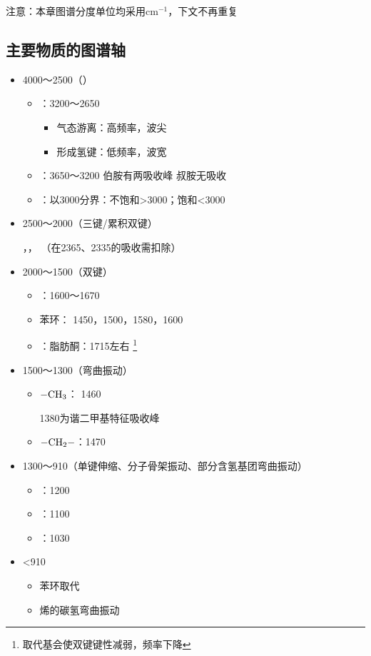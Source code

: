 注意：本章图谱分度单位均采用$\mathrm{cm^{-1}}$，下文不再重复

\subsection{主要物质的图谱轴}
\begin{itemize}
    \item 4000～2500（）
    \begin{itemize}         
        \item {}：3200～2650
        \begin{itemize}
            \item 气态游离：高频率，波尖
            \item 形成氢键：低频率，波宽
        \end{itemize}       
        \item {}：3650～3200	伯胺有两吸收峰 叔胺无吸收
        \item {}：以3000分界：不饱和>3000；饱和<3000
    \end{itemize}
    \item 2500～2000（三键/累积双键）
    \begin{example}                             
        ，， （在2365、2335的吸收需扣除）
    \end{example}
    \item 2000～1500（双键）
    \begin{itemize}         
        \item {}：1600～1670
        \item 苯环：   1450，1500，1580，1600
        \item {}：脂肪酮：1715左右
        \footnote{取代基会使双键键性减弱，频率下降}
    \end{itemize}
    \item 1500～1300（弯曲振动）
    \begin{itemize}        
        \item $\ce{-CH3}$： 1460
        \begin{note}
            1380为谐二甲基特征吸收峰
        \end{note}            
        \item $\ce{-CH_{2}-}$：1470
    \end{itemize}
    \item 1300～910（单键伸缩、分子骨架振动、部分含氢基团弯曲振动）
    \begin{itemize}    
        \item {}：1200
		\item {}：1100
		\item {}：1030
    \end{itemize}
    \item <910
    \begin{itemize}
        \item 苯环取代
        \item 烯的碳氢弯曲振动
    \end{itemize}
\end{itemize}

